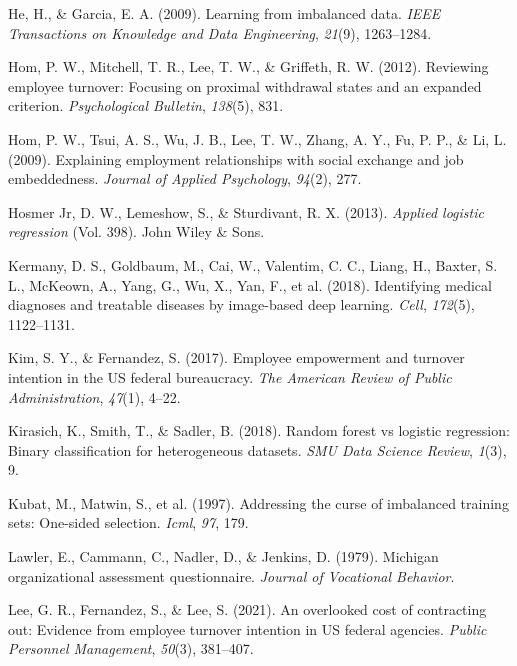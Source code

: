 \documentclass[
  man]{apa7}
\newlength{\cslhangindent}
\newlength{\cslentryspacingunit} %
\newenvironment{CSLReferences}[2] %
 {%
  \setlength{\parindent}{0pt}
  \ifodd #1
  \let\oldpar\par
  \def\par{\hangindent=\cslhangindent\oldpar}
  \fi
  \setlength{\parskip}{#2\cslentryspacingunit}
 }%
 {}
\begin{document}
\begin{CSLReferences}{1}{0}
\leavevmode{}%
He, H., \& Garcia, E. A. (2009). Learning from imbalanced data. \emph{IEEE Transactions on Knowledge and Data Engineering}, \emph{21}(9), 1263--1284.

\leavevmode{}%
Hom, P. W., Mitchell, T. R., Lee, T. W., \& Griffeth, R. W. (2012). Reviewing employee turnover: Focusing on proximal withdrawal states and an expanded criterion. \emph{Psychological Bulletin}, \emph{138}(5), 831.

\leavevmode{}%
Hom, P. W., Tsui, A. S., Wu, J. B., Lee, T. W., Zhang, A. Y., Fu, P. P., \& Li, L. (2009). Explaining employment relationships with social exchange and job embeddedness. \emph{Journal of Applied Psychology}, \emph{94}(2), 277.

\leavevmode{}%
Hosmer Jr, D. W., Lemeshow, S., \& Sturdivant, R. X. (2013). \emph{Applied logistic regression} (Vol. 398). John Wiley \& Sons.

\leavevmode{}%
Kermany, D. S., Goldbaum, M., Cai, W., Valentim, C. C., Liang, H., Baxter, S. L., McKeown, A., Yang, G., Wu, X., Yan, F., et al. (2018). Identifying medical diagnoses and treatable diseases by image-based deep learning. \emph{Cell}, \emph{172}(5), 1122--1131.

\leavevmode{}%
Kim, S. Y., \& Fernandez, S. (2017). Employee empowerment and turnover intention in the US federal bureaucracy. \emph{The American Review of Public Administration}, \emph{47}(1), 4--22.

\leavevmode{}%
Kirasich, K., Smith, T., \& Sadler, B. (2018). Random forest vs logistic regression: Binary classification for heterogeneous datasets. \emph{SMU Data Science Review}, \emph{1}(3), 9.

\leavevmode{}%
Kubat, M., Matwin, S., et al. (1997). Addressing the curse of imbalanced training sets: One-sided selection. \emph{Icml}, \emph{97}, 179.

\leavevmode{}%
Lawler, E., Cammann, C., Nadler, D., \& Jenkins, D. (1979). Michigan organizational assessment questionnaire. \emph{Journal of Vocational Behavior}.

\leavevmode{}%
Lee, G. R., Fernandez, S., \& Lee, S. (2021). An overlooked cost of contracting out: Evidence from employee turnover intention in US federal agencies. \emph{Public Personnel Management}, \emph{50}(3), 381--407.


\end{CSLReferences}
\end{document}
